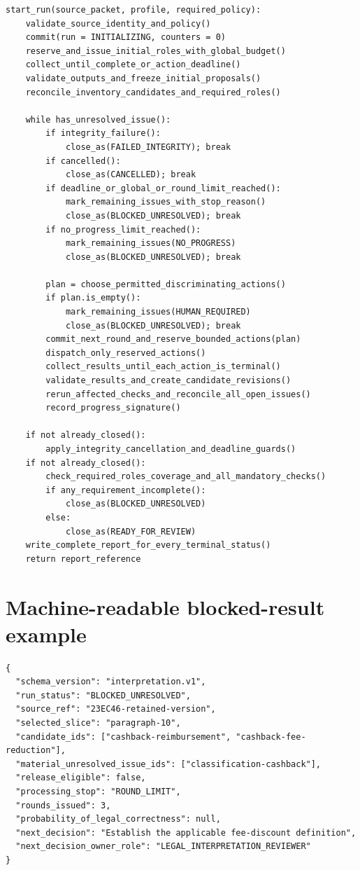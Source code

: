 \documentclass[12pt,a4paper,oneside,openany]{book}
\begin{document}
\begin{lstlisting}[caption={Main controller, with explicit terminal uncertainty.}]
start_run(source_packet, profile, required_policy):
    validate_source_identity_and_policy()
    commit(run = INITIALIZING, counters = 0)
    reserve_and_issue_initial_roles_with_global_budget()
    collect_until_complete_or_action_deadline()
    validate_outputs_and_freeze_initial_proposals()
    reconcile_inventory_candidates_and_required_roles()

    while has_unresolved_issue():
        if integrity_failure():
            close_as(FAILED_INTEGRITY); break
        if cancelled():
            close_as(CANCELLED); break
        if deadline_or_global_or_round_limit_reached():
            mark_remaining_issues_with_stop_reason()
            close_as(BLOCKED_UNRESOLVED); break
        if no_progress_limit_reached():
            mark_remaining_issues(NO_PROGRESS)
            close_as(BLOCKED_UNRESOLVED); break

        plan = choose_permitted_discriminating_actions()
        if plan.is_empty():
            mark_remaining_issues(HUMAN_REQUIRED)
            close_as(BLOCKED_UNRESOLVED); break
        commit_next_round_and_reserve_bounded_actions(plan)
        dispatch_only_reserved_actions()
        collect_results_until_each_action_is_terminal()
        validate_results_and_create_candidate_revisions()
        rerun_affected_checks_and_reconcile_all_open_issues()
        record_progress_signature()

    if not already_closed():
        apply_integrity_cancellation_and_deadline_guards()
    if not already_closed():
        check_required_roles_coverage_and_all_mandatory_checks()
        if any_requirement_incomplete():
            close_as(BLOCKED_UNRESOLVED)
        else:
            close_as(READY_FOR_REVIEW)
    write_complete_report_for_every_terminal_status()
    return report_reference
\end{lstlisting}

\section{Machine-readable blocked-result example}

\begin{lstlisting}[caption={A blocked result preserves alternatives and the next decision.}]
{
  "schema_version": "interpretation.v1",
  "run_status": "BLOCKED_UNRESOLVED",
  "source_ref": "23EC46-retained-version",
  "selected_slice": "paragraph-10",
  "candidate_ids": ["cashback-reimbursement", "cashback-fee-reduction"],
  "material_unresolved_issue_ids": ["classification-cashback"],
  "release_eligible": false,
  "processing_stop": "ROUND_LIMIT",
  "rounds_issued": 3,
  "probability_of_legal_correctness": null,
  "next_decision": "Establish the applicable fee-discount definition",
  "next_decision_owner_role": "LEGAL_INTERPRETATION_REVIEWER"
}
\end{lstlisting}
\end{document}
